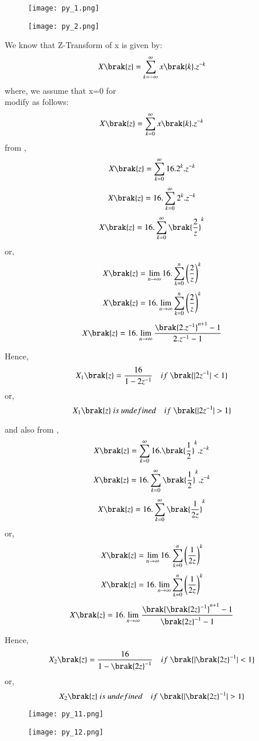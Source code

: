 \documentclass[beamer]{IEEEtran}
\theoremstyle{remark}
\begin{document}
\begin{figure}[h]
    \centering
    \texttt{[image: py\_1.png]}
    \label{fig:enter-label}
\end{figure}

\begin{figure}[h]
    \centering
    \texttt{[image: py\_2.png]}
    \label{fig:enter-label}
\end{figure}

We know that Z-Transform of x is given by:
\begin{align}
\label{a13}
    X\brak{z}=\sum_{k=-\infty}^{\infty} x\brak{k}.z^{-k}
\end{align}
where, we assume that x=0   for \\
\brak{\ref{a13}} modify as follows:
\begin{align}
\label{a14}
    X\brak{z}=\sum_{k=0}^{\infty} x\brak{k}.z^{-k}
\end{align}
from \brak{\ref{a11}},
$$X\brak{z}=\sum_{k=0}^{\infty} 16.2^k.z^{-k}$$
$$X\brak{z}=16.\sum_{k=0}^{\infty} 2^k.z^{-k}$$
$$X\brak{z}=16.\sum_{k=0}^{\infty} \brak{\frac{2}{z}}^k$$
or,
$$X\brak{z}=\lim_{n\to\infty}16.\sum_{k=0}^{n} \left(\frac{2}{z}\right)^k$$
$$X\brak{z}=16.\lim_{n\to\infty}\sum_{k=0}^{n}
\left(\frac{2}{z}\right)^k$$
$$X\brak{z}=16.\lim_{n\to\infty} \frac{\brak{2.z^{-1}}^{n+1}-1}{2.z^{-1}-1}$$

Hence,
$$X_1\brak{z}=\frac{16}{1-2z^{-1}}\quad if\ \brak{|2z^{-1}|<1}$$
or,
$$X_1\brak{z}\ is\ undefined\quad if\ \brak{|2z^{-1}|>1}$$

and also from \brak{\ref{a12}},
$$X\brak{z}=\sum_{k=0}^{\infty} 16.\brak{\frac{1}{2}}^k.z^{-k}$$
$$X\brak{z}=16.\sum_{k=0}^{\infty} \brak{\frac{1}{2}}^k.z^{-k}$$
$$X\brak{z}=16.\sum_{k=0}^{\infty} \brak{\frac{1}{2z}}^k$$
or,
$$X\brak{z}=\lim_{n\to\infty}16.\sum_{k=0}^{n} \left(\frac{1}{2z}\right)^k$$
$$X\brak{z}=16.\lim_{n\to\infty}\sum_{k=0}^{n}
\left(\frac{1}{2z}\right)^k$$
$$X\brak{z}=16.\lim_{n\to\infty} \frac{\brak{\brak{2z}^{-1}}^{n+1}-1}{{\brak{2z}^{-1}}-1}$$

Hence,
$$X_2\brak{z}=\frac{16}{1-{\brak{2z}^{-1}}}\quad if\ \brak{|{\brak{2z}^{-1}}|<1}$$
or,
$$X_2\brak{z}\ is\ undefined\quad if\ \brak{|{\brak{2z}^{-1}}|>1}$$
\begin{figure}[h]
    \centering
    \texttt{[image: py\_11.png]}
    \label{fig:enter-label}
\end{figure}
\begin{figure}[h]
    \centering
    \texttt{[image: py\_12.png]}
    \label{fig:enter-label}
\end{figure}
\end{document}
